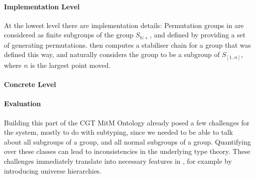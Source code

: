 \paragraph{Implementation Level}
At the lowest level there are implementation details: Permutation groups in \GAP
are considered as finite subgroups of the group $S_{\mathbb{N}+}$, and defined by
providing a set of generating permutations. \GAP then computes a stabiliser chain
for a group that was defined this way, and naturally considers the group to be a
subgroup of $S_{[1..n]}$, where $n$ is the largest point moved.

\paragraph{Concrete Level}

\paragraph{Evaluation}
Building this part of the CGT MitM Ontology already posed a few challenges for
the \MMT system, mostly to do with subtyping, since we needed to be able to talk
about all subgroups of a group, and all normal subgroups of a group. Quantifying
over these classes can lead to inconsistencies in the underlying type theory.
These challenges immediately translate into necessary
features in \OMMT, for example by introducing universe hierarchies.


